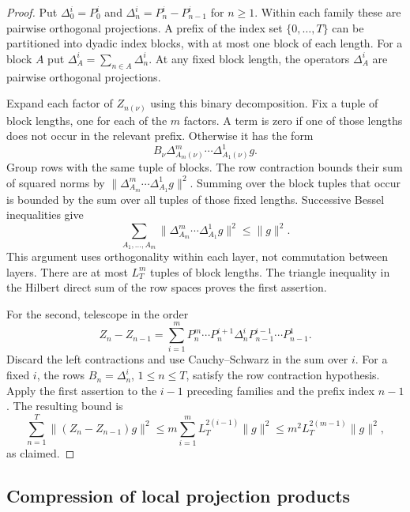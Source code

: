 \begin{proof}
Put $\Delta_0^i=P_0^i$ and $\Delta_n^i=P_n^i-P_{n-1}^i$ for $n\ge1$.
Within each family these are pairwise orthogonal projections.  A prefix of
the index set $\{0,\ldots,T\}$ can be partitioned into dyadic index blocks,
with at most one block of each length.  For a block $A$ put
$\Delta_A^i=\sum_{n\in A}\Delta_n^i$.  At any fixed block length, the
operators $\Delta_A^i$ are pairwise orthogonal projections.

Expand each factor of $Z_{n(\nu)}$ using this binary decomposition.  Fix a
tuple of block lengths, one for each of the $m$ factors.  A term is zero if
one of those lengths does not occur in the relevant prefix.  Otherwise it
has the form
\[
 B_\nu\Delta_{A_m(\nu)}^m\cdots\Delta_{A_1(\nu)}^1g.
\]
Group rows with the same tuple of blocks.  The row contraction bounds their
sum of squared norms by
$\|\Delta_{A_m}^m\cdots\Delta_{A_1}^1g\|^2$.  Summing over the block
tuples that occur is bounded by the sum over all tuples of those fixed
lengths.  Successive Bessel inequalities give
\[
 \sum_{A_1,\ldots,A_m}
       \|\Delta_{A_m}^m\cdots\Delta_{A_1}^1g\|^2\le\|g\|^2.
\]
This argument uses orthogonality within each layer, not commutation between
layers.  There are at most $L_T^m$ tuples of block lengths.  The triangle
inequality in the Hilbert direct sum of the row spaces proves the first
assertion.

For the second, telescope in the order
\[
 Z_n-Z_{n-1}
   =\sum_{i=1}^m
       P_n^m\cdots P_n^{i+1}\Delta_n^i
                       P_{n-1}^{i-1}\cdots P_{n-1}^1.
\]
Discard the left contractions and use Cauchy--Schwarz in the sum over $i$.
For a fixed $i$, the rows $B_n=\Delta_n^i$, $1\le n\le T$, satisfy the row
contraction hypothesis.  Apply the first assertion to the $i-1$ preceding
families and the prefix index $n-1$.  The resulting bound is
\[
 \sum_{n=1}^T\|(Z_n-Z_{n-1})g\|^2
    \le m\sum_{i=1}^m L_T^{2(i-1)}\|g\|^2
    \le m^2L_T^{2(m-1)}\|g\|^2,
\]
as claimed.
\end{proof}

\subsection{Compression of local projection products}

